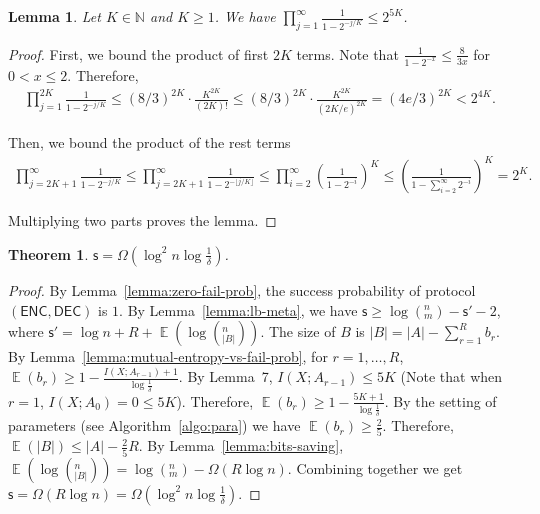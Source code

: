 \documentclass[10pt]{article}
\newtheorem{theorem}{Theorem}
\newtheorem{lemma}{Lemma}
\DeclareMathOperator*{\E}{\mathbb{E}}
\newcommand{\enc}{\textsf{ENC}\xspace}
\newcommand{\dec}{\textsf{DEC}\xspace}
\newcommand{\s}{\textsf{s}\xspace}
\begin{document}
\begin{lemma}\label{lemma:Pochhammer}
  Let $K\in \mathbb{N}$ and $K\ge 1$. We have $\prod_{j=1}^{\infty} \frac{1}{1-2^{-j/K}}\le 2^{5K}$.
\end{lemma}

\begin{proof}
  First, we bound the product of first $2K$ terms. Note that $\frac{1}{1-2^{-x}}\le \frac{8}{3x}$ for $0<x\le 2$. Therefore, 
  \begin{align}
    \prod_{j=1}^{2K}\frac{1}{1-2^{-j/K}}
    \le (8/3)^{2K}\cdot \frac{K^{2K}}{(2K)!}
    \le (8/3)^{2K}\cdot \frac{K^{2K}}{(2K/e)^{2K}}
    = (4e/3)^{2K}
    < 2^{4K}. 
  \end{align}
  
  Then, we bound the product of the rest terms
  \begin{align}
    \prod_{j=2K+1}^{\infty}\frac{1}{1-2^{-j/K}} 
    \le \prod_{j=2K+1}^{\infty}\frac{1}{1-2^{-\lfloor j/K \rfloor}} 
    \le \prod_{i=2}^{\infty}\left( \frac{1}{1-2^{-i}}\right)^K 
    \le \left( \frac{1}{1-\sum_{i=2}^{\infty}2^{-i}}\right)^K
    = 2^K.
  \end{align}
  
  Multiplying two parts proves the lemma.
\end{proof}

\begin{theorem}
  $\s = \Omega(\log^2 n\log{\frac{1}{\delta}})$.
\end{theorem}

\begin{proof}
  By Lemma~\ref{lemma:zero-fail-prob}, the success probability of protocol $(\enc,\dec)$ is $1$. 
  By Lemma~\ref{lemma:lb-meta}, we have $\s\ge \log (^n_m) - \s' -2$, where $\s'=\log n + R+ \E(\log (^n_{|B|}))$. 
  The size of $B$ is $|B|=|A|-\sum_{r=1}^{R}{b_r}$.
  By Lemma~\ref{lemma:mutual-entropy-vs-fail-prob}, for $r=1, \ldots, R$, $\E(b_r)\ge 1-\frac{I(X;A_{r-1})+1}{\log\frac{1}{\delta}}$. 
  By Lemma~7, $I(X;A_{r-1})\le 5K$ (Note that when $r=1$, $I(X;A_0)=0\le 5K$). Therefore, $\E(b_r)\ge 1-\frac{5K+1}{\log\frac{1}{\delta}}$.
  By the setting of parameters (see Algorithm~\ref{algo:para}) we have $\E(b_r)\ge \frac{2}{5}$. Therefore, $\E(|B|)\le |A|-\frac{2}{5}R$. 
  By Lemma~\ref{lemma:bits-saving}, $\E(\log (^n_{|B|}))=\log (^n_m)-\Omega(R\log n)$. 
  Combining together we get $\s=\Omega(R\log n)=\Omega(\log^2 n \log\frac{1}{\delta})$.
\end{proof}



\end{document}
